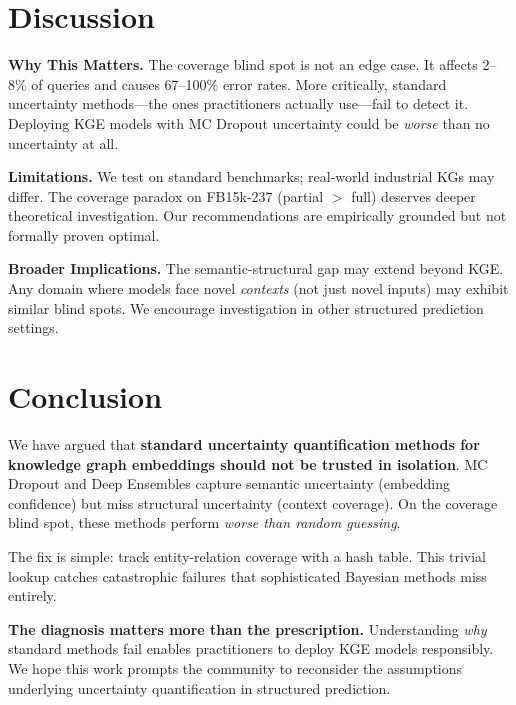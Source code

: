 \documentclass{article}
\begin{document}
\section{Discussion}

\textbf{Why This Matters.} The coverage blind spot is not an edge case. It affects 2--8\% of queries and causes 67--100\% error rates. More critically, standard uncertainty methods---the ones practitioners actually use---fail to detect it. Deploying KGE models with MC Dropout uncertainty could be \emph{worse} than no uncertainty at all.

\textbf{Limitations.} We test on standard benchmarks; real-world industrial KGs may differ. The coverage paradox on FB15k-237 (partial $>$ full) deserves deeper theoretical investigation. Our recommendations are empirically grounded but not formally proven optimal.

\textbf{Broader Implications.} The semantic-structural gap may extend beyond KGE. Any domain where models face novel \emph{contexts} (not just novel inputs) may exhibit similar blind spots. We encourage investigation in other structured prediction settings.

\section{Conclusion}

We have argued that \textbf{standard uncertainty quantification methods for knowledge graph embeddings should not be trusted in isolation}. MC Dropout and Deep Ensembles capture semantic uncertainty (embedding confidence) but miss structural uncertainty (context coverage). On the coverage blind spot, these methods perform \emph{worse than random guessing}.

The fix is simple: track entity-relation coverage with a hash table. This trivial lookup catches catastrophic failures that sophisticated Bayesian methods miss entirely.

\textbf{The diagnosis matters more than the prescription.} Understanding \emph{why} standard methods fail enables practitioners to deploy KGE models responsibly. We hope this work prompts the community to reconsider the assumptions underlying uncertainty quantification in structured prediction.
\end{document}
